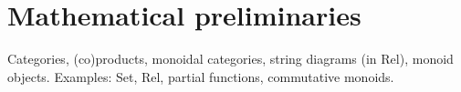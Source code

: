 \chapter{Mathematical preliminaries}

Categories, (co)products, monoidal categories, string diagrams (in Rel),
monoid objects.
Examples: Set, Rel, partial functions, commutative monoids.
